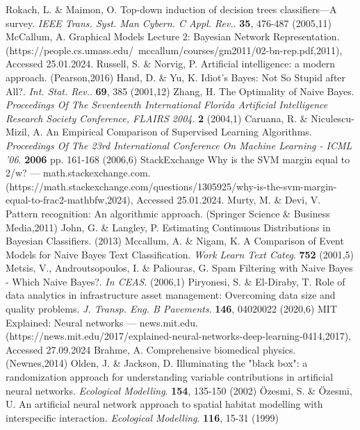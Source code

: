 \documentclass[sn-mathphys-num]{sn-jnl}%
\begin{document}
\begin{thebibliography}{000}
Rokach, L. \& Maimon, O. Top-down induction of decision trees classifiers—A survey. {\em IEEE Trans. Syst. Man Cybern. C Appl. Rev.}. \textbf{35}, 476-487 (2005,11)
McCallum, A. Graphical Models Lecture 2: Bayesian Network Representation. (https://people.cs.umass.edu/ mccallum/courses/gm2011/02-bn-rep.pdf,2011), Accessed 25.01.2024.
Russell, S. \& Norvig, P. Artificial intelligence: a modern approach. (Pearson,2016)
Hand, D. \& Yu, K. Idiot's Bayes: Not So Stupid after All?. {\em Int. Stat. Rev.}. \textbf{69}, 385 (2001,12)
Zhang, H. The Optimality of Naive Bayes. {\em Proceedings Of The Seventeenth International Florida Artificial Intelligence Research Society Conference, FLAIRS 2004}. \textbf{2} (2004,1)
Caruana, R. \& Niculescu-Mizil, A. An Empirical Comparison of Supervised Learning Algorithms. {\em Proceedings Of The 23rd International Conference On Machine Learning - ICML '06}. \textbf{2006} pp. 161-168 (2006,6)
StackExchange Why is the SVM margin equal to 2/w? — math.stackexchange.com. (https://math.stackexchange.com/questions/1305925/why-is-the-svm-margin-equal-to-frac2-mathbfw,2024), Accessed 25.01.2024.
Murty, M. \& Devi, V. Pattern recognition: An algorithmic approach. (Springer Science & Business Media,2011)
John, G. \& Langley, P. Estimating Continuous Distributions in Bayesian Classifiers.  (2013)
Mccallum, A. \& Nigam, K. A Comparison of Event Models for Naive Bayes Text Classification. {\em Work Learn Text Categ}. \textbf{752} (2001,5)
Metsis, V., Androutsopoulos, I. \& Paliouras, G. Spam Filtering with Naive Bayes - Which Naive Bayes?. {\em In CEAS}. (2006,1)
Piryonesi, S. \& El-Diraby, T. Role of data analytics in infrastructure asset management: Overcoming data size and quality problems. {\em J. Transp. Eng. B Pavements}. \textbf{146}, 04020022 (2020,6)
MIT Explained: Neural networks — news.mit.edu. (https://news.mit.edu/2017/explained-neural-networks-deep-learning-0414,2017), Accessed 27.09.2024
Brahme, A. Comprehensive biomedical physics. (Newnes,2014)
Olden, J. \& Jackson, D. Illuminating the "black box": a randomization approach for understanding variable contributions in artificial neural networks. {\em Ecological Modelling}. \textbf{154}, 135-150 (2002)
Özesmi, S. \& Özesmi, U. An artificial neural network approach to spatial habitat modelling with interspecific interaction. {\em Ecological Modelling}. \textbf{116}, 15-31 (1999)

\end{thebibliography}
\end{document}
